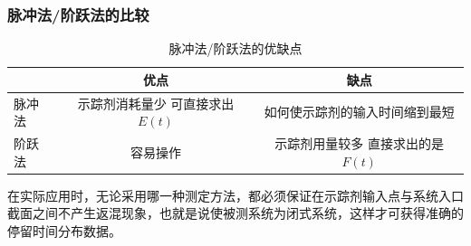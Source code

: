 \begin{frame}
    \frametitle{脉冲法/阶跃法的比较}

    \begin{table}[]
        \caption{脉冲法/阶跃法的优缺点}
        \begin{tabular}{l|cc}
        \hline
         & 优点 & 缺点 \\ \hline
        脉冲法 & \makecell{示踪剂消耗量少 \\ 可直接求出$E(t)$} & 如何使示踪剂的输入时间缩到最短 \\ \cline{2-3} 
        阶跃法 & 容易操作 & \makecell{示踪剂用量较多 \\ 直接求出的是$F(t)$} \\ \hline
        \end{tabular}
        \end{table}
        在实际应用时，无论采用哪一种测定方法，都必须保证在示踪剂输入点与系统入口截面之间不产生返混现象，也就是说使被测系统为闭式系统，这样才可获得准确的停留时间分布数据。

\end{frame}
